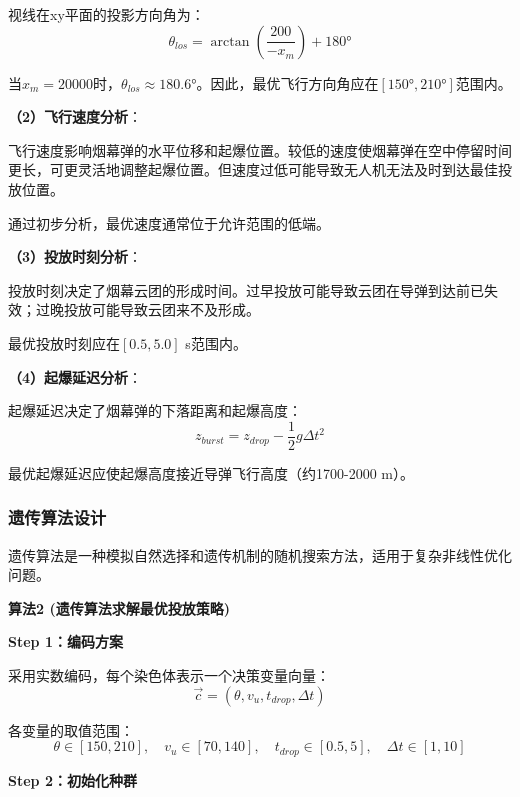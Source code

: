 \documentclass[12pt,a4paper]{article}
\begin{document}
\indent 视线在xy平面的投影方向角为：
\begin{equation}
\theta_{los} = \arctan\left(\frac{200}{-x_m}\right) + 180°
\end{equation}

\indent 当$x_m = 20000$时，$\theta_{los} \approx 180.6°$。因此，最优飞行方向角应在$[150°, 210°]$范围内。

\noindent\textbf{（2）飞行速度分析}：

\indent 飞行速度影响烟幕弹的水平位移和起爆位置。较低的速度使烟幕弹在空中停留时间更长，可更灵活地调整起爆位置。但速度过低可能导致无人机无法及时到达最佳投放位置。

\indent 通过初步分析，最优速度通常位于允许范围的低端。

\noindent\textbf{（3）投放时刻分析}：

\indent 投放时刻决定了烟幕云团的形成时间。过早投放可能导致云团在导弹到达前已失效；过晚投放可能导致云团来不及形成。

\indent 最优投放时刻应在$[0.5, 5.0]$ s范围内。

\noindent\textbf{（4）起爆延迟分析}：

\indent 起爆延迟决定了烟幕弹的下落距离和起爆高度：
\begin{equation}
z_{burst} = z_{drop} - \frac{1}{2}g\Delta t^2
\end{equation}

\indent 最优起爆延迟应使起爆高度接近导弹飞行高度（约1700-2000 m）。

\subsubsection{遗传算法设计}

\indent 遗传算法是一种模拟自然选择和遗传机制的随机搜索方法，适用于复杂非线性优化问题。

\noindent\textbf{算法2 (遗传算法求解最优投放策略)}

\indent \textbf{Step 1：编码方案}

\indent 采用实数编码，每个染色体表示一个决策变量向量：
\begin{equation}
\vec{c} = (\theta, v_u, t_{drop}, \Delta t)
\end{equation}

\indent 各变量的取值范围：
\begin{equation}
\theta \in [150, 210], \quad v_u \in [70, 140], \quad t_{drop} \in [0.5, 5], \quad \Delta t \in [1, 10]
\end{equation}

\indent \textbf{Step 2：初始化种群}
\end{document}
